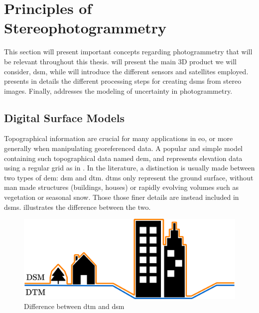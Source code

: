 \chapter{Principles of Stereophotogrammetry}\label{chap:stereophotogrammetry}

This section will present important concepts regarding photogrammetry that will be relevant throughout this thesis.  will present the main 3D product we will consider, \ie \acrshort{dsm}, while  will introduce the different sensors and satellites employed.  presents in details the different processing steps for creating \acrshort{dsm}s from stereo images. Finally,  addresses the modeling of uncertainty in photogrammetry.

\section{Digital Surface Models}\label{sec:dsm}
Topographical information are crucial for many applications in \acrfull{eo}, or more generally when manipulating georeferenced data. A popular and simple model containing such topographical data named \acrlong{dem}, and represents elevation data using a regular grid as in . In the literature, a distinction is usually made between two types of \acrshort{dem}: \acrlong{dsm} and \acrlong{dtm}. \acrshort{dtm}s only represent the ground surface, without man made structures (buildings, houses) or rapidly evolving volumes such as vegetation or seasonal snow. Those those finer details are instead included in \acrshort{dsm}s.  illustrates the difference between the two.

\begin{figure}
    \centering
    \includegraphics[width=0.8\linewidth]{Images/Chap_1/DTM_DSM.png}
    \caption{Difference between \acrlong{dtm} and \acrlong{dsm}}
    \label{fig:DTM_DSM}
\end{figure}

